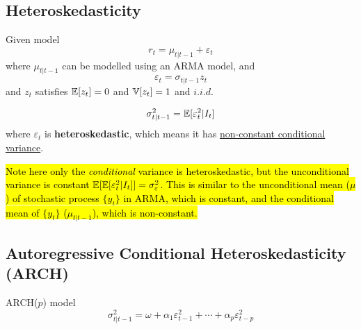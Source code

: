 \documentclass[11pt]{article}
\begin{document}
	    \subsection{Heteroskedasticity}
	        \begin{definition}
	            Given model
	            \begin{equation}
	                r_t = \mu_{t|t-1} + \varepsilon_t
	            \end{equation}
	            where $\mu_{t|t-1}$ can be modelled using an ARMA model, and 
	            \begin{equation}
	                \varepsilon_t = \sigma_{t|t-1} z_t
	            \end{equation}
	            and $z_t$ satisfies $\mathbb{E}[{z_t}] = 0$ and $\mathbb{V}[{z_t}] = 1$ and $i.i.d.$
	        \end{definition}
	        
	        \begin{remark}
	            \begin{equation}
	                \sigma_{t|t-1}^2 = \mathbb{E}[{\varepsilon_t^2|I_t}]
	            \end{equation}
	            where $\varepsilon_t$ is \textbf{heteroskedastic}, which means it has \ul{non-constant conditional variance}.
	        \end{remark}
	        
	        \begin{remark}
	            \hl{Note here only the \emph{conditional} variance is heteroskedastic, but the unconditional variance is constant $\mathbb{E}[{\mathbb{E}[{\varepsilon_t^2|I_t}]}] = \sigma_\varepsilon^2$. This is similar to the unconditional mean ($\mu$) of stochastic process $\{y_t\}$ in ARMA, which is constant, and the conditional mean of $\{y_t\}$ ($\mu_{t|t-1}$), which is non-constant.}
	        \end{remark}
	    \subsection{Autoregressive Conditional Heteroskedasticity (ARCH)}
            \begin{definition}
                ARCH($p$) model
                \begin{equation}
                    \sigma_{t|t-1}^2 = \omega + \alpha_1 \varepsilon_{t-1}^2 + \cdots + \alpha_p \varepsilon_{t-p}^2
                \end{equation}
            \end{definition}
            
\end{document}
